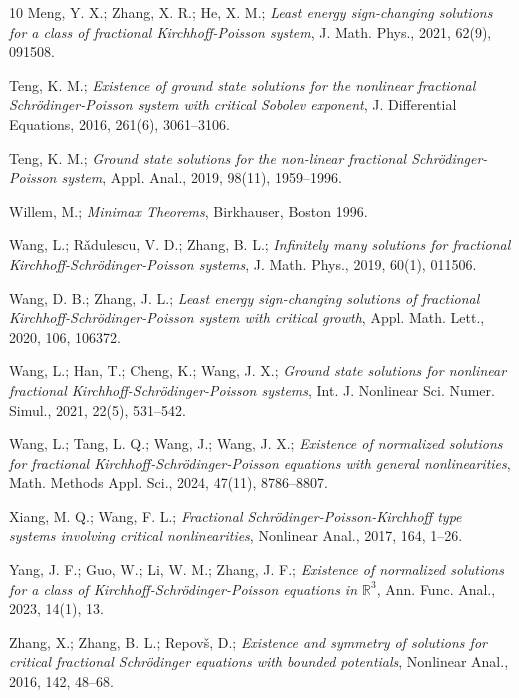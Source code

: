 \documentclass[11pt]{article}
\numberwithin{equation}{section}
\begin{document}
\begin{thebibliography}{10}
   Meng, Y. X.; Zhang, X. R.; He, X. M.;
\emph{Least energy sign-changing solutions for a class of fractional Kirchhoff-Poisson 
system}, J. Math. Phys., 2021, 62(9), 091508.

 Teng, K. M.;
\emph{Existence of ground state solutions for the nonlinear fractional 
Schr\"odinger-Poisson system with critical Sobolev exponent},
J. Differential Equations, 2016, 261(6),  3061--3106.

  Teng, K. M.;
\emph{Ground state solutions for the non-linear fractional Schr\"odinger-Poisson system},
Appl. Anal., 2019, 98(11),  1959--1996.

  Willem, M.;
\emph{Minimax Theorems}, Birkhauser, Boston 1996.

  Wang, L.; R\v{a}dulescu, V. D.; Zhang, B. L.;
\emph{Infinitely many solutions for fractional Kirchhoff-Schr\"odinger-Poisson systems},
J. Math. Phys., 2019, 60(1), 011506.

  Wang, D. B.; Zhang, J. L.;
\emph{Least energy sign-changing solutions of fractional Kirchhoff-Schr\"odinger-Poisson 
system with critical growth}, Appl. Math. Lett., 2020,  106, 106372.

  Wang, L.;  Han, T.;  Cheng, K.; Wang, J. X.;
\emph{Ground state solutions for nonlinear fractional Kirchhoff-Schr\"odinger-Poisson 
systems}, Int. J. Nonlinear Sci. Numer. Simul., 2021,  22(5), 531--542.

 Wang, L.; Tang, L. Q.; Wang, J.; Wang, J. X.;
\emph{Existence of normalized solutions for fractional Kirchhoff-Schr\"odinger-Poisson 
equations with general nonlinearities},
 Math. Methods Appl. Sci., 2024, 47(11), 8786--8807.

 Xiang, M. Q.; Wang, F. L.;
\emph{Fractional Schr\"odinger-Poisson-Kirchhoff type systems involving critical 
nonlinearities}, Nonlinear Anal., 2017, 164, 1--26.

 Yang, J. F.; Guo, W.; Li, W. M.; Zhang, J. F.;
\emph{Existence of normalized solutions for a class of Kirchhoff-Schr\"odinger-Poisson 
equations in $\mathbb{R}^3$}, Ann. Func. Anal., 2023, 14(1), 13.

 Zhang, X.; Zhang, B. L.; Repov\v{s}, D.;
\emph{Existence and symmetry of solutions for critical fractional Schr\"odinger
 equations with bounded potentials}, Nonlinear Anal., 2016, 142, 48--68.
\end{thebibliography}
\end{document}
